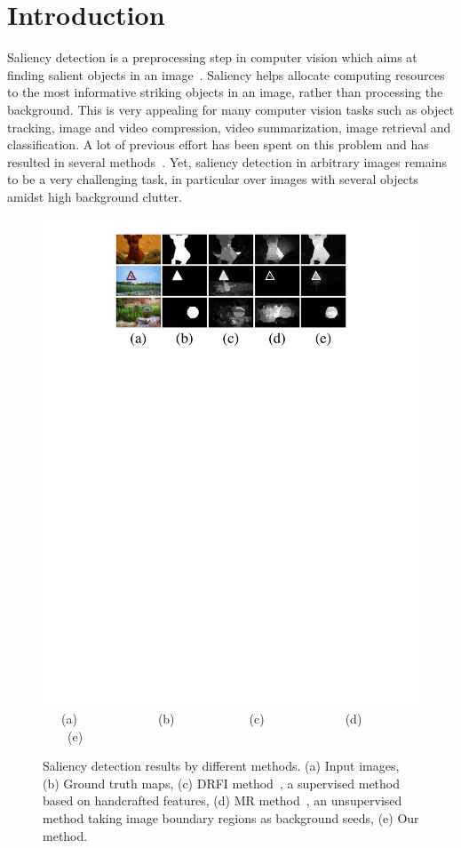 \documentclass[journal]{IEEEtran}
\begin{document}
\section{Introduction}
Saliency detection is a preprocessing step in computer vision which aims at finding salient objects in an image~\cite{Achanta2010SLIC}. Saliency helps allocate computing resources to the most informative striking objects in an image, rather than processing the background. This is very appealing for many computer vision tasks such as object tracking, image and video compression, video summarization, image retrieval and classification. A lot of previous effort has been spent on this problem and has resulted in several methods~\cite{borji2015salient,Borji_PAMI13}. Yet, saliency detection in arbitrary images remains to be a very challenging task, in particular over images with several objects amidst high background clutter. 

\begin{figure}
\begin{center}
\label{fig:1}
 \includegraphics[width=1\linewidth]{figure1.pdf}
   {~~~(a)~~~~~~~~~~~~~(b)~~~~~~~~~~~~(c)~~~~~~~~~~~~~(d)~~~~~~~~~~~~~(e)~~~}
\end{center}
\vspace{-10pt}
\caption{\small{Saliency detection results by different methods. (a) Input images, (b) Ground truth maps, (c) DRFI method~\cite{jiang2013salient}, a supervised method based on handcrafted features, (d) MR method~\cite{yang2013saliency}, an unsupervised method taking image boundary regions as background seeds, (e) Our method.}}
\end{figure}
\end{document}
